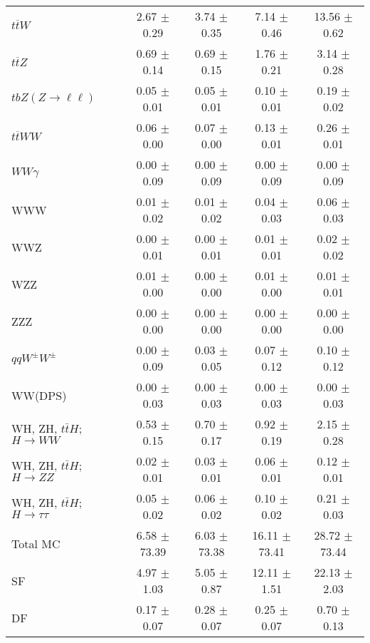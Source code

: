 \begin{tabular}{l|cccc}
                   $t\overline{t}W$ &  2.67 $\pm$  0.29 &  3.74 $\pm$  0.35 &  7.14 $\pm$  0.46 & 13.56 $\pm$  0.62 \\
                   $t\overline{t}Z$ &  0.69 $\pm$  0.14 &  0.69 $\pm$  0.15 &  1.76 $\pm$  0.21 &  3.14 $\pm$  0.28 \\
    $tbZ (Z \rightarrow \ell \ell)$ &  0.05 $\pm$  0.01 &  0.05 $\pm$  0.01 &  0.10 $\pm$  0.01 &  0.19 $\pm$  0.02 \\
                  $t\overline{t}WW$ &  0.06 $\pm$  0.00 &  0.07 $\pm$  0.00 &  0.13 $\pm$  0.01 &  0.26 $\pm$  0.01 \\
                         $WW\gamma$ &  0.00 $\pm$  0.09 &  0.00 $\pm$  0.09 &  0.00 $\pm$  0.09 &  0.00 $\pm$  0.09 \\
                                WWW &  0.01 $\pm$  0.02 &  0.01 $\pm$  0.02 &  0.04 $\pm$  0.03 &  0.06 $\pm$  0.03 \\
                                WWZ &  0.00 $\pm$  0.01 &  0.00 $\pm$  0.01 &  0.01 $\pm$  0.01 &  0.02 $\pm$  0.02 \\
                                WZZ &  0.01 $\pm$  0.00 &  0.00 $\pm$  0.00 &  0.01 $\pm$  0.00 &  0.01 $\pm$  0.01 \\
                                ZZZ &  0.00 $\pm$  0.00 &  0.00 $\pm$  0.00 &  0.00 $\pm$  0.00 &  0.00 $\pm$  0.00 \\
                 $qqW^{\pm}W^{\pm}$ &  0.00 $\pm$  0.09 &  0.03 $\pm$  0.05 &  0.07 $\pm$  0.12 &  0.10 $\pm$  0.12 \\
                            WW(DPS) &  0.00 $\pm$  0.03 &  0.00 $\pm$  0.03 &  0.00 $\pm$  0.03 &  0.00 $\pm$  0.03 \\
WH, ZH, $t\bar{t}H$; $H \rightarrow WW$ &  0.53 $\pm$  0.15 &  0.70 $\pm$  0.17 &  0.92 $\pm$  0.19 &  2.15 $\pm$  0.28 \\
WH, ZH, $t\bar{t}H$; $H \rightarrow ZZ$ &  0.02 $\pm$  0.01 &  0.03 $\pm$  0.01 &  0.06 $\pm$  0.01 &  0.12 $\pm$  0.01 \\
WH, ZH, $t\bar{t}H$; $H \rightarrow \tau\tau$ &  0.05 $\pm$  0.02 &  0.06 $\pm$  0.02 &  0.10 $\pm$  0.02 &  0.21 $\pm$  0.03 \\
\hline\hline
                           Total MC &  6.58 $\pm$ 73.39 &  6.03 $\pm$ 73.38 & 16.11 $\pm$ 73.41 & 28.72 $\pm$ 73.44 \\
\hline
                                 SF &  4.97 $\pm$  1.03 &  5.05 $\pm$  0.87 & 12.11 $\pm$  1.51 & 22.13 $\pm$  2.03 \\
                                 DF &  0.17 $\pm$  0.07 &  0.28 $\pm$  0.07 &  0.25 $\pm$  0.07 &  0.70 $\pm$  0.13 \\

\end{tabular}

